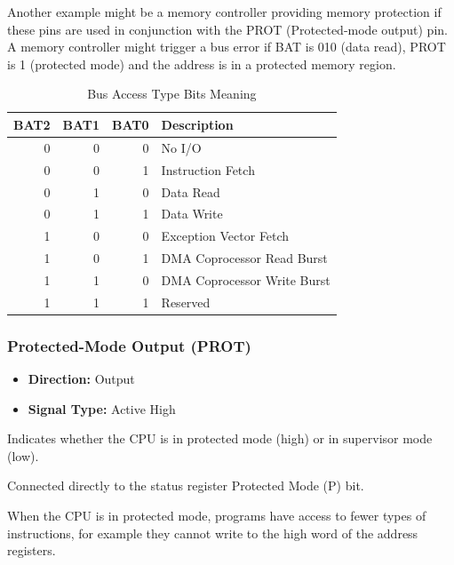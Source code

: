 Another example might be a memory controller providing memory protection if these pins are used in conjunction with the
PROT (Protected-mode output) pin. A memory controller might trigger a bus error if BAT is 010 (data read), PROT is 1
(protected mode) and the address is in a protected memory region.

\begin{table}[H]
	\centering
	\begin{tabular}{rrrl}
		\toprule
		\textbf{BAT2} & \textbf{BAT1} & \textbf{BAT0} & \textbf{Description}        \\
		\midrule
		0             & 0             & 0             & No I/O                      \\
		0             & 0             & 1             & Instruction Fetch           \\
		0             & 1             & 0             & Data Read                   \\
		0             & 1             & 1             & Data Write                  \\
		1             & 0             & 0             & Exception Vector Fetch      \\
		1             & 0             & 1             & DMA Coprocessor Read Burst  \\
		1             & 1             & 0             & DMA Coprocessor Write Burst \\
		1             & 1             & 1             & Reserved                    \\
		\bottomrule
	\end{tabular}
	\caption{Bus Access Type Bits Meaning}
\end{table}

\subsubsection{Protected-Mode Output (PROT)}

\begin{itemize}
	\item \textbf{Direction:} Output
	\item \textbf{Signal Type:} Active High
\end{itemize}

Indicates whether the CPU is in protected mode (high) or in supervisor mode (low).

Connected directly to the status register Protected Mode (P) bit.

When the CPU is in protected mode, programs have access to fewer types of instructions, for example they cannot write
to the high word of the address registers.

